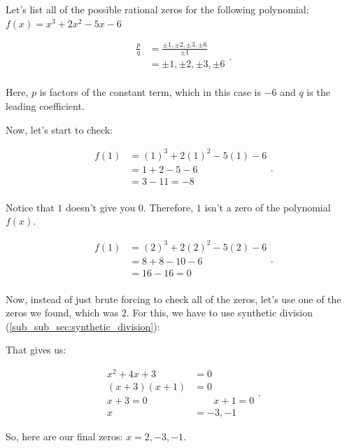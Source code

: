\begin{example}
  \label{exm:rational_zero_theorem}

  Let's list all of the possible rational zeros for the following polynomial:
  $f(x) = x^{3} + 2x^{2} - 5x - 6$

  \begin{equation}
    \label{eqt:rational_zero_theorem}
    \begin{split}
      \frac{p}{q} &= \frac{\pm 1, \pm 2, \pm 3, \pm 6}{\pm 1} \\
                  &= \pm 1, \pm 2, \pm 3, \pm 6 \\
    \end{split}
  .\end{equation}

  Here, $p$ is factors of the constant term, which in this case is  $-6$ and $q$
  is the leading coefficient.

  Now, let's start to check:

  \begin{equation}
    \label{eqt:checking_zeros_from_rational_zero_theorem}
    \begin{split}
      f(1) &= (1)^{3} + 2(1)^{2} - 5(1) - 6 \\
           &= 1 + 2 - 5 - 6 \\
           &= 3 - 11 = -8 \\
    \end{split}
  .\end{equation}

  Notice that $1$ doesn't give you $0$. Therefore, $1$ isn't a zero of the
  polynomial $f(x)$.

  \begin{equation}
    \label{eqt:checking_zeros_from_rational_zero_theorem}
    \begin{split}
      f(1) &= (2)^{3} + 2(2)^{2} - 5(2) - 6 \\
           &= 8 + 8 - 10 - 6 \\
           &= 16 - 16 = 0 \\
    \end{split}
  .\end{equation}

  Now, instead of just brute forcing to check all of the zeros, let's use one of
  the zeros we found, which was $2$. For this, we have to use synthetic
  division (\ref{sub_sub_sec:synthetic_division}):


  That gives us:

  \begin{equation}
    \label{eqt:after_synthetic_division}
    \begin{split}
      x^{2} + 4x + 3 &= 0 \\
      (x + 3)(x + 1) &= 0 \\
      x + 3 = 0 \qquad&\qquad x + 1 = 0 \\
      x &= -3, -1
    \end{split}
  .\end{equation}

  So, here are our final zeros: $x = 2, -3, -1$.
\end{example}

\newpage
